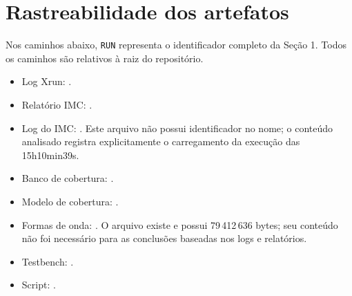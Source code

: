 \documentclass[11pt,a4paper]{article}
\begin{document}
\section{Rastreabilidade dos artefatos}
Nos caminhos abaixo, \texttt{RUN} representa o identificador completo da
Seção 1. Todos os caminhos são relativos à raiz do repositório.
\begin{itemize}
\item Log Xrun: .
\item Relatório IMC: .
\item Log do IMC: .
Este arquivo não possui identificador no nome; o conteúdo analisado registra
explicitamente o carregamento da execução das 15h10min39s.
\item Banco de cobertura: .
\item Modelo de cobertura: .
\item Formas de onda: .
O arquivo existe e possui 79\,412\,636 bytes; seu conteúdo não foi necessário
para as conclusões baseadas nos logs e relatórios.
\item Testbench: .
\item Script: .
\end{itemize}
\end{document}
